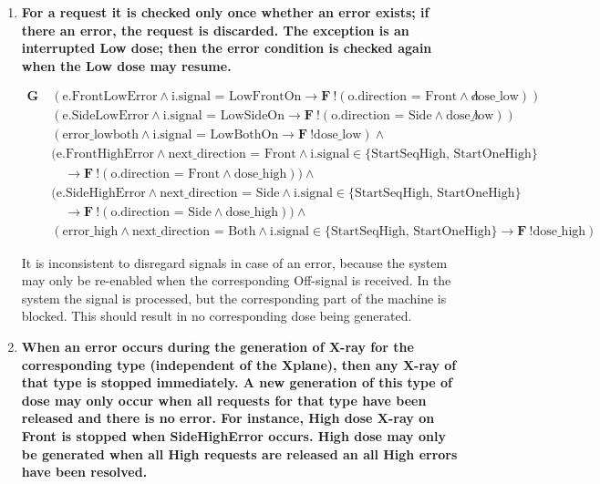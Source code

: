 \documentclass[a4paper,10pt]{article}
\newcommand{\LTLG}{\mathbf{G~}}
\newcommand{\LTLF}{\mathbf{F~}}
\newcommand{\imply}{\rightarrow}
\newcommand{\doselow}{\textrm{dose\_low}}
\newcommand{\dosehigh}{\textrm{dose\_high}}
\newcommand{\errorlowboth}{\textrm{error\_lowboth}}
\newcommand{\errorhigh}{\textrm{error\_high}}
\begin{document}
\begin{enumerate}
		\item \textbf{For a request it is checked only once whether an error exists; if there an error, the request is discarded.
			The exception is an interrupted Low dose; then the error condition is checked again when the Low dose may resume.}

			\begin{align*}
				\LTLG & (\textrm{e.FrontLowError} \land \textrm{i.signal = LowFrontOn} \imply \LTLF !(\textrm{o.direction = Front} \land \doselow)) \land \\
				& (\textrm{e.SideLowError} \land \textrm{i.signal = LowSideOn} \imply \LTLF !(\textrm{o.direction = Side} \land \doselow)) \land \\
				& (\errorlowboth \land \textrm{i.signal = LowBothOn} \imply \LTLF !\doselow) \land \\
				& (\textrm{e.FrontHighError} \land \textrm{next\_direction = Front} \land \textrm{i.signal} \in \{\textrm{StartSeqHigh, StartOneHigh}\} \\
				&\hspace{1em}	\imply \LTLF !(\textrm{o.direction = Front} \land \dosehigh)) \land \\
				& (\textrm{e.SideHighError} \land \textrm{next\_direction = Side} \land \textrm{i.signal} \in \{\textrm{StartSeqHigh, StartOneHigh}\} \\
				&\hspace{1em}	\imply \LTLF !(\textrm{o.direction = Side} \land \dosehigh)) \land \\
				& (\errorhigh \land \textrm{next\_direction = Both} \land \textrm{i.signal} \in \{\textrm{StartSeqHigh, StartOneHigh}\} \imply \LTLF !\dosehigh)
			\end{align*}

			It is inconsistent to disregard signals in case of an error, because the system may only be re-enabled when the corresponding Off-signal is received.
			In the system the signal is processed, but the corresponding part of the machine is blocked.
			This should result in no corresponding dose being generated.

		\item \textbf{When an error occurs during the generation of X-ray for the corresponding type (independent of the Xplane), then any X-ray of that type is stopped immediately.
			A new generation of this type of dose may only occur when all requests for that type have been released and there is no error.
			For instance, High dose X-ray on Front is stopped when SideHighError occurs.
			High dose may only be generated when all High requests are released an all High errors have been resolved.}
			

\end{enumerate}
\end{document}
